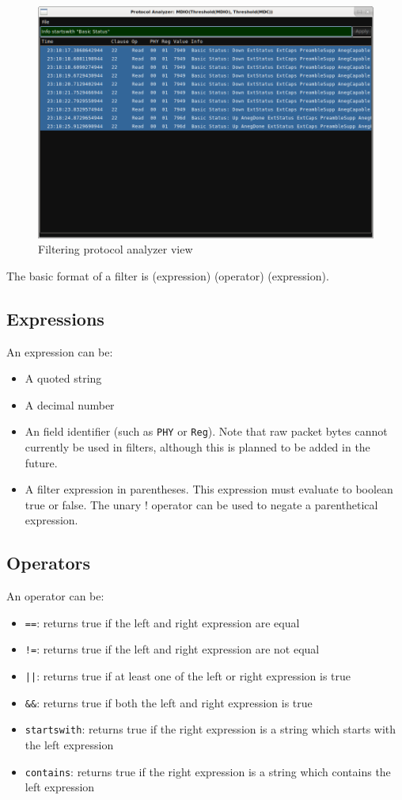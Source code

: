 \begin{figure}[H]
\centering
\includegraphics[width=14cm]{images/proto-filter.png}
\caption{Filtering protocol analyzer view}
\label{proto-filter}
\end{figure}

The basic format of a filter is (expression) (operator) (expression).

\subsection{Expressions}

An expression can be:
\begin{itemize}
\item A quoted string
\item A decimal number
\item An field identifier (such as \texttt{PHY} or \texttt{Reg}). Note that raw packet bytes cannot currently be used
in filters, although this is planned to be added in the future.
\item A filter expression in parentheses. This expression must evaluate to boolean true or false. The unary ! operator
can be used to negate a parenthetical expression.
\end{itemize}

\subsection{Operators}

An operator can be:
\begin{itemize}
\item \texttt{==}: returns true if the left and right expression are equal
\item \texttt{!=}: returns true if the left and right expression are not equal
\item \texttt{||}: returns true if at least one of the left or right expression is true
\item \texttt{\&\&}: returns true if both the left and right expression is true
\item \texttt{startswith}: returns true if the right expression is a string which starts with the left expression
\item \texttt{contains}: returns true if the right expression is a string which contains the left expression
\end{itemize}

